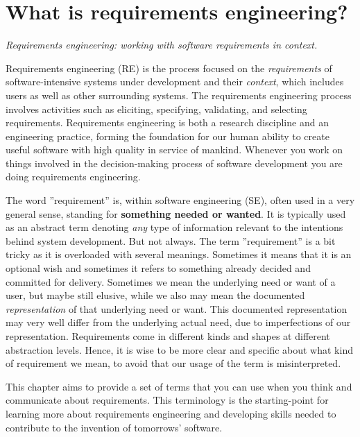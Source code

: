 
\chapter*{What is requirements engineering?}

\textit{Requirements engineering: working with software requirements in context.}

\vspace{1em}

\noindent Requirements engineering (RE) is the process focused on the \textit{requirements} of software-intensive systems under development and their \textit{context}, which includes users as well as other surrounding systems. 
The requirements engineering process involves activities such as eliciting, specifying, validating, and selecting requirements. 
Requirements engineering is both a research discipline and an engineering practice, forming the foundation for our human ability to create useful software with high quality in service of mankind. Whenever you work on things involved in the decision-making process of software development you are doing requirements engineering.  

The word ''requirement'' is, within software engineering (SE), often used in a very general sense, standing for \textbf{something needed or wanted}. It is typically used as an abstract term denoting \textit{any} type of information relevant to the intentions behind system development. But not always. The term ''requirement'' is a bit tricky as it is overloaded with several meanings. Sometimes it means that it is an optional wish and sometimes it refers to something already decided and committed for delivery. Sometimes we mean the underlying need or want of a user, but maybe still elusive, while we also may mean the documented \textit{representation} of that underlying need or want. This documented representation may very well differ from the underlying actual need, due to imperfections of our representation. Requirements come in different kinds and shapes at different abstraction levels. Hence, it is wise to be more clear and specific about what kind of requirement we mean, to avoid that our usage of the term is misinterpreted. 

This chapter aims to provide a set of terms that you can use when you think and communicate about requirements. This terminology is the starting-point for learning more about requirements engineering and developing skills needed to contribute to the invention of tomorrows' software.

